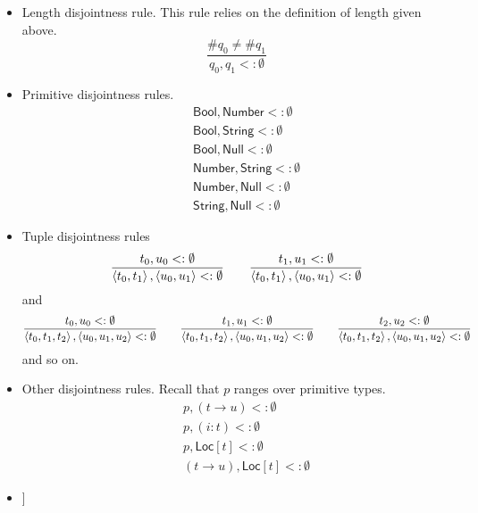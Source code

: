 \documentclass[12pt]{article}
\begin{document}
\begin{itemize}
\item Length disjointness rule. This rule relies on the definition of length
given above.%
\begin{equation*}
\frac{\#q_{0}\neq \#q_{1}}{q_{0},q_{1}<:\emptyset }
\end{equation*}

\item Primitive disjointness rules.%
\begin{eqnarray*}
&&\mathsf{Bool},\mathsf{Number} <: \emptyset \\
&&\mathsf{Bool},\mathsf{String} <:\emptyset \\
&&\mathsf{Bool},\mathsf{Null} <:\emptyset \\
&&\mathsf{Number},\mathsf{String} <:\emptyset \\
&&\mathsf{Number},\mathsf{Null} <:\emptyset \\
&&\mathsf{String},\mathsf{Null} <:\emptyset
\end{eqnarray*}

\item Tuple disjointness rules%
\begin{equation*}
\frac{t_{0},u_{0}<:\emptyset }{\left\langle t_{0},t_{1}\right\rangle
,\left\langle u_{0},u_{1}\right\rangle <:\emptyset }\qquad \frac{%
t_{1},u_{1}<:\emptyset }{\left\langle t_{0},t_{1}\right\rangle ,\left\langle
u_{0},u_{1}\right\rangle <:\emptyset }
\end{equation*}%
and%
\begin{equation*}
\frac{t_{0},u_{0}<:\emptyset }{\left\langle t_{0},t_{1},t_{2}\right\rangle
,\left\langle u_{0},u_{1},u_{2}\right\rangle <:\emptyset }\qquad \frac{%
t_{1},u_{1}<:\emptyset }{\left\langle t_{0},t_{1},t_{2}\right\rangle
,\left\langle u_{0},u_{1},u_{2}\right\rangle <:\emptyset }\qquad \frac{%
t_{2},u_{2}<:\emptyset }{\left\langle t_{0},t_{1},t_{2}\right\rangle
,\left\langle u_{0},u_{1},u_{2}\right\rangle <:\emptyset }
\end{equation*}%
and so on.

\item Other disjointness rules. Recall that $p$ ranges over primitive types.%
\begin{eqnarray*}
&&p,\left( t\rightarrow u\right) <:\emptyset \\
&&p,\left( i:t\right) <:\emptyset \\
&&p,\mathsf{Loc}[t]<:\emptyset \\
&&\left( t\rightarrow u\right) ,\mathsf{Loc}[t]<:\emptyset
\end{eqnarray*}

\item {}]
\end{itemize}
\end{document}
